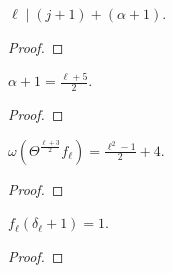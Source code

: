 \begin{lemma}
  \label{lem:ldiv_j_add_a}
  \leanok
  $\ell \mid (j + 1) + (\alpha + 1)$. 
\end{lemma}
\begin{proof}
  \leanok
\end{proof}

\begin{lemma}
  \label{lem:alpha_equal}
  \leanok
  $\alpha + 1 = \frac{\ell + 5}{2}$.
\end{lemma}
\begin{proof}
  \leanok
\end{proof}

\begin{theorem}
  \label{thm:Filt_Theta_l_add_three_div_two}
  \leanok
  $ \omega (\Theta^{\frac{\ell + 3}{2}} f_\ell)= \frac{\ell^2 - 1}{2} + 4 $.

\end{theorem}
\begin{proof}
  \leanok
\end{proof}

\begin{lemma}
  \label{lem:fl_delta_add_one}
  \leanok
  $f_\ell (\delta_\ell + 1) = 1$. 
\end{lemma}
\begin{proof}
  \leanok
\end{proof}

